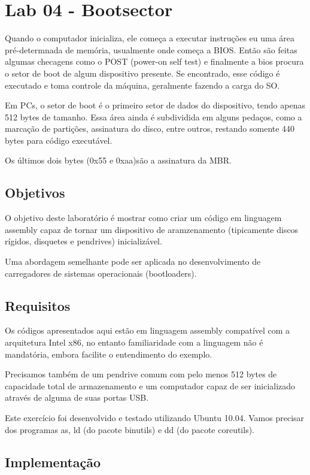 \chapter{Lab 04 - Bootsector}

Quando o computador inicializa, ele começa a executar instruções eu uma área pré-determnada de memória, usualmente onde começa a BIOS. Então são feitas algumas checagens como o POST (power-on self test) e finalmente a bios procura o setor de boot de algum dispositivo presente. Se encontrado, esse código é executado e toma controle da máquina, geralmente fazendo a carga do SO.

Em PCs, o setor de boot é o primeiro setor de dados do dispositivo, tendo apenas 512 bytes de tamanho. Essa área ainda é subdividida em alguns pedaços, como a marcação de partições, assinatura do disco, entre outros, restando somente 440 bytes para código executável.

Os últimos dois bytes (0x55 e 0xaa)são a assinatura da MBR\cite{Susam}.

\section{Objetivos}

O objetivo deste laboratório é mostrar como criar um código em linguagem assembly capaz de tornar um dispositivo de aramzenamento (tipicamente discos rígidos, disquetes e pendrives) inicializável.

Uma abordagem semelhante pode ser aplicada no desenvolvimento de carregadores de sistemas operacionais (bootloaders).

\section{Requisitos}

Os códigos apresentados aqui estão em linguagem assembly compatível com a arquitetura Intel x86, no entanto familiaridade com a linguagem não é mandatória, embora facilite o entendimento do exemplo.

Precisamos também de um pendrive comum com pelo menos 512 bytes de capacidade total de armazenamento e um computador capaz de ser inicializado através de alguma de suas portas USB.

Este exercício foi desenvolvido e testado utilizando Ubuntu 10.04. Vamos precisar dos programas as, ld (do pacote binutils) e dd (do pacote coreutils).

\section{Implementação}

